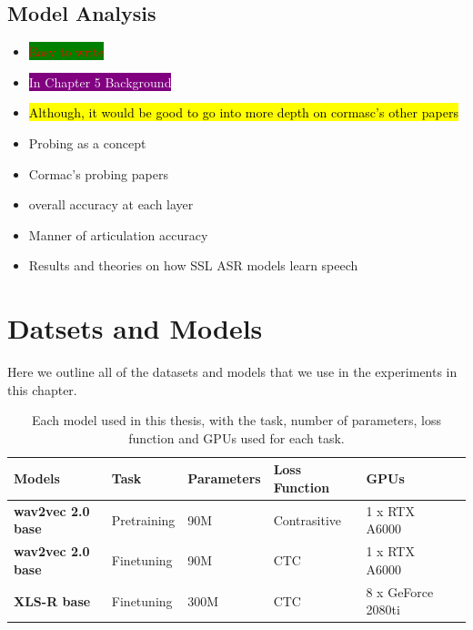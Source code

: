 \subsection{Model Analysis}
\begin{itemize}
    \item \colorbox{green}{\textcolor{red}{Easy to write}}
    \item \colorbox{purple}{\textcolor{white}{In Chapter 5 Background}}
    \item \hl{Although, it would be good to go into more depth on cormasc's other papers}
    \item Probing as a concept \cite{immer2021probing, schneiderleveraging}
    \item Cormac's probing papers \cite{english2022domain, plusothers}
    \item overall accuracy at each layer
    \item Manner of articulation accuracy
    \item Results and theories on how SSL ASR models learn speech
\end{itemize}
\fi


\section{Datsets and Models}\label{lr_sec:datasets_models}
Here we outline all of the datasets and models that we use in the experiments in this chapter. 

\begin{table}[h]
\centering
\begin{tabular}{l|lllll}
\hline
\textbf{Models}           & \textbf{Task} & \textbf{Parameters} & \textbf{Loss Function} & \textbf{GPUs} \\ \hline
\textbf{wav2vec 2.0 base} & Pretraining   & 90M                 & Contrasitive           & 1 x  RTX A6000      \\
\textbf{wav2vec 2.0 base} & Finetuning    & 90M                 & CTC                    & 1 x  RTX A6000      \\
\textbf{XLS-R base}       & Finetuning    & 300M                & CTC                    & 8 x  GeForce 2080ti \\ \hline
\end{tabular}
\caption{Each model used in this thesis, with the task, number of parameters, loss function and GPUs used for each task.}
\label{lr_tab:models_in_experiments}
\end{table}

